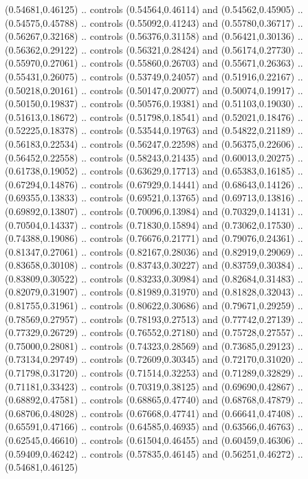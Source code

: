    (0.54681,0.46125)
    .. controls (0.54564,0.46114) and (0.54562,0.45905) .. (0.54575,0.45788)
    .. controls (0.55092,0.41243) and (0.55780,0.36717) .. (0.56267,0.32168)
    .. controls (0.56376,0.31158) and (0.56421,0.30136) .. (0.56362,0.29122)
    .. controls (0.56321,0.28424) and (0.56174,0.27730) .. (0.55970,0.27061)
    .. controls (0.55860,0.26703) and (0.55671,0.26363) .. (0.55431,0.26075)
    .. controls (0.53749,0.24057) and (0.51916,0.22167) .. (0.50218,0.20161)
    .. controls (0.50147,0.20077) and (0.50074,0.19917) .. (0.50150,0.19837)
    .. controls (0.50576,0.19381) and (0.51103,0.19030) .. (0.51613,0.18672)
    .. controls (0.51798,0.18541) and (0.52021,0.18476) .. (0.52225,0.18378)
    .. controls (0.53544,0.19763) and (0.54822,0.21189) .. (0.56183,0.22534)
    .. controls (0.56247,0.22598) and (0.56375,0.22606) .. (0.56452,0.22558)
    .. controls (0.58243,0.21435) and (0.60013,0.20275) .. (0.61738,0.19052)
    .. controls (0.63629,0.17713) and (0.65383,0.16185) .. (0.67294,0.14876)
    .. controls (0.67929,0.14441) and (0.68643,0.14126) .. (0.69355,0.13833)
    .. controls (0.69521,0.13765) and (0.69713,0.13816) .. (0.69892,0.13807)
    .. controls (0.70096,0.13984) and (0.70329,0.14131) .. (0.70504,0.14337)
    .. controls (0.71830,0.15894) and (0.73062,0.17530) .. (0.74388,0.19086)
    .. controls (0.76676,0.21771) and (0.79076,0.24361) .. (0.81347,0.27061)
    .. controls (0.82167,0.28036) and (0.82919,0.29069) .. (0.83658,0.30108)
    .. controls (0.83743,0.30227) and (0.83759,0.30384) .. (0.83809,0.30522)
    .. controls (0.83233,0.30984) and (0.82684,0.31483) .. (0.82079,0.31907)
    .. controls (0.81989,0.31970) and (0.81828,0.32043) .. (0.81755,0.31961)
    .. controls (0.80622,0.30686) and (0.79671,0.29259) .. (0.78569,0.27957)
    .. controls (0.78193,0.27513) and (0.77742,0.27139) .. (0.77329,0.26729)
    .. controls (0.76552,0.27180) and (0.75728,0.27557) .. (0.75000,0.28081)
    .. controls (0.74323,0.28569) and (0.73685,0.29123) .. (0.73134,0.29749)
    .. controls (0.72609,0.30345) and (0.72170,0.31020) .. (0.71798,0.31720)
    .. controls (0.71514,0.32253) and (0.71289,0.32829) .. (0.71181,0.33423)
    .. controls (0.70319,0.38125) and (0.69690,0.42867) .. (0.68892,0.47581)
    .. controls (0.68865,0.47740) and (0.68768,0.47879) .. (0.68706,0.48028)
    .. controls (0.67668,0.47741) and (0.66641,0.47408) .. (0.65591,0.47166)
    .. controls (0.64585,0.46935) and (0.63566,0.46763) .. (0.62545,0.46610)
    .. controls (0.61504,0.46455) and (0.60459,0.46306) .. (0.59409,0.46242)
    .. controls (0.57835,0.46145) and (0.56251,0.46272) .. (0.54681,0.46125)
